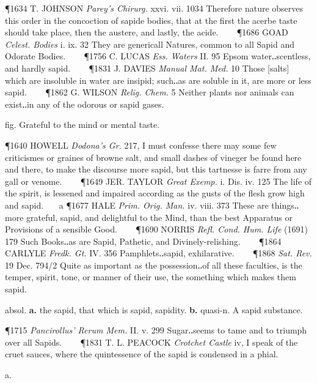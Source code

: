 \begin{description}[wide, labelwidth=!, labelindent=0pt]
\begin{myenumerate}
\P 1634 T. JOHNSON  \textit{Parey's Chirurg.} xxvi. vii. 1034 Therefore  nature observes this order in the concoction of sapide bodies, that at the first the acerbe taste should take place, then the austere, and lastly, the acide.    
\P 1686 GOAD  \textit{Celest. Bodies} i. ix. 32 They are genericall Natures, common to all Sapid and Odorate Bodies.    
\P 1756 C. LUCAS  \textit{Ess. Waters} II. 95 Epsom water‥scentless, and hardly sapid.    
\P 1831 J. DAVIES  \textit{Manual Mat. Med.} 10 Those [salts] which are insoluble in water are insipid; such‥as are soluble in it, are more or less sapid.    
\P 1862 G. WILSON  \textit{Relig. Chem.} 5 Neither plants nor animals can exist‥in any of the odorous or sapid gases.

 fig. Grateful to the mind or mental taste.

\P 1640 HOWELL  \textit{Dodona's Gr.} 217, I must confesse there may some few criticismes or graines of browne salt, and small dashes of vineger be found here and there, to make the discourse more sapid, but this tartnesse is farre from any gall or venome.    
\P 1649 JER. TAYLOR  \textit{Great Exemp.} i. Dis. iv. 125 The life of the spirit, is lessened and impaired according as the gusts of the flesh grow high and sapid.    a 
\P 1677 HALE  \textit{Prim. Orig. Man.} iv. viii. 373 These are things‥more grateful, sapid, and delightful to the Mind, than the best Apparatus or Provisions of a sensible Good.    
\P 1690 NORRIS  \textit{Refl. Cond. Hum. Life} (1691) 179 Such Books‥as are Sapid, Pathetic, and Divinely-relishing.    
\P 1864 CARLYLE  \textit{Fredk. Gt.} IV. 356 Pamphlets‥sapid, exhilarative.    
\P 1868  \textit{Sat. Rev.} 19 Dec. 794/2 Quite as important as the possession‥of all these faculties, is the temper, spirit, tone, or manner of their use, the something which makes them sapid.

 absol. \textbf{a.} the sapid, that which is sapid, sapidity. \textbf{b.} quasi-n. A sapid substance.

\P 1715 \textit{Pancirollus'  Rerum Mem.} II. v. 299 Sugar‥seems to tame and to triumph over all Sapids.    
\P 1831 T. L. PEACOCK  \textit{Crotchet Castle} iv, I speak of the cruet sauces, where the quintessence of the sapid is condensed in a phial.



\end{myenumerate}


 a.

\noindent {}


\end{description}
